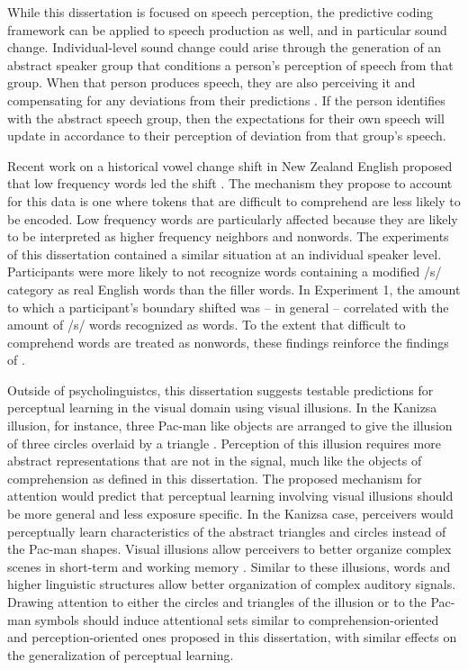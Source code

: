 While this dissertation is focused on speech perception, the predictive coding framework can be applied to speech production as well, and in particular sound change.
Individual-level sound change could arise through the generation of an abstract speaker group that conditions a person's perception of speech from that group.
When that person produces speech, they are also perceiving it and compensating for any deviations from their predictions \citep{Hickok2011}.
If the person identifies with the abstract speech group, then the expectations for their own speech will update in accordance to their perception of deviation from that group's speech.

Recent work on a historical vowel change shift in New Zealand English proposed that low frequency words led the shift \citep{Hay2015}.
The mechanism they propose to account for this data is one where tokens that are difficult to comprehend are less likely to be encoded.
Low frequency words are particularly affected because they are likely to be interpreted as higher frequency neighbors and nonwords.
The experiments of this dissertation contained a similar situation at an individual speaker level.
Participants were more likely to not recognize words containing a modified /s/ category as real English words than the filler words.
In Experiment 1, the amount to which a participant's boundary shifted was -- in general -- correlated with the amount of /s/ words recognized as words.
To the extent that difficult to comprehend words are treated as nonwords, these findings reinforce the findings of \citet{Hay2015}.

Outside of psycholinguistcs, this dissertation suggests testable predictions for perceptual learning in the visual domain using visual illusions.
In the Kanizsa illusion, for instance, three Pac-man like objects are arranged to give the illusion of three circles overlaid by a triangle \citep{Kanizsa1976}.
Perception of this illusion requires more abstract representations that are not in the signal, much like the objects of comprehension as defined in this dissertation.
The proposed mechanism for attention would predict that perceptual learning involving visual illusions should be more general and less exposure specific.
In the Kanizsa case, perceivers would perceptually learn characteristics of the abstract triangles and circles instead of the Pac-man shapes.
Visual illusions allow perceivers to better organize complex scenes in short-term and working memory \citep{Vandenbroucke2012}.
Similar to these illusions, words and higher linguistic structures allow better organization of complex auditory signals.
Drawing attention to either the circles and triangles of the illusion or to the Pac-man symbols should induce attentional sets similar to comprehension-oriented and perception-oriented ones proposed in this dissertation, with similar effects on the generalization of perceptual learning.

